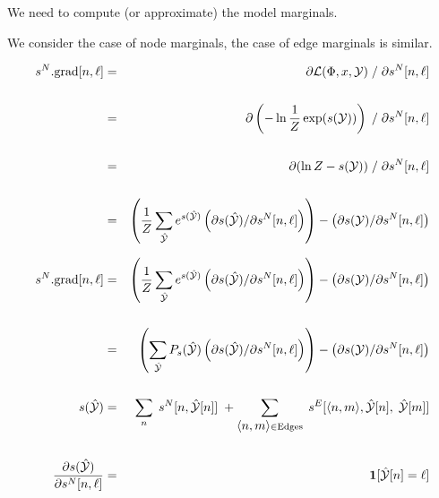 {\vfill
We need to compute (or approximate) the model marginals.


We consider the case of node marginals, the case of edge marginals is similar.

{\huge
\begin{eqnarray*}
    s^N.\mathrm{grad}[n,\ell] & = & \partial {\cal L}(\Phi,x,{\cal Y})\;/\;\partial s^N[n,\ell] \\
    \\
    & = & \partial \left(-\ln \frac{1}{Z}\exp(s({\cal Y}))\right)\;/\;\partial s^N[n,\ell] \\
    \\
    & = & \partial (\ln Z - s({\cal Y}))\;/\;\partial s^N[n,\ell] \\
    \\
    & = & \left(\frac{1}{Z} \sum_{\hat{\cal Y}} e^{s(\hat{\cal Y})} \left(\partial s(\hat{\cal Y})/\partial s^N[n,\ell]\right)\right)
    - \left(\partial s({\cal Y}) /\partial s^N[n,\ell]\right) 
\end{eqnarray*}
}


{\huge
\begin{eqnarray*}
    s^N.\mathrm{grad}[n,\ell] & = & \left(\frac{1}{Z} \sum_{\hat{\cal Y}} e^{s(\hat{\cal Y})} \left(\partial s(\hat{\cal Y})/\partial s^N[n,\ell]\right)\right)
    - \left(\partial s({\cal Y}) /\partial s^N[n,\ell]\right)  \\
    \\
    & = & \left(\sum_{\hat{\cal Y}} P_s(\hat{\cal Y}) \left(\partial s(\hat{\cal Y})/\partial s^N[n,\ell]\right)\right)
    - \left(\partial s({\cal Y}) /\partial s^N[n,\ell]\right)    \\
    \\
    s(\hat{\cal Y}) & = & \sum_n\;s^N[n,\hat{\cal Y}[n]]\; + \sum_{{\mbox{$\langle n,m\rangle$}} \in \mathrm{Edges}}\;s^E[{\mbox{$\langle n,m\rangle$}},\hat{\cal Y}[n],\;\hat{\cal Y}[m]] \\
    \\
    \frac{\partial s(\hat{\cal Y})}{\partial s^N[n,\ell]} & = & \mathbf{1}[\hat{\cal Y}[n] = \ell]
\end{eqnarray*}
}


}
